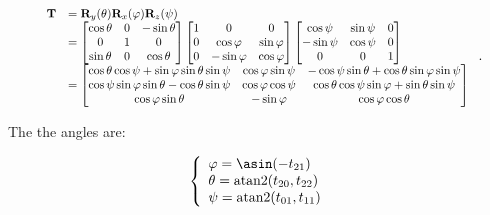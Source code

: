     \begin{equation}
        \scalebox{0.85}{
            $ \begin{array}{ll}
                \mathbf{T}
                &= \mathbf{R}_{y}(\theta)\mathbf{R}_{x}(\varphi)\mathbf{R}_{z}(\psi) \\
                &=
                \begin{bmatrix}
                    \cos \theta & 0 & -\sin \theta \\
                    0 & 1 & 0 \\
                    \sin \theta & 0 & \cos \theta
                \end{bmatrix}
                \begin{bmatrix}
                    1 & 0 & 0 \\
                    0 & \cos \varphi & \sin \varphi \\
                    0 & -\sin \varphi & \cos \varphi
                \end{bmatrix}
                \begin{bmatrix}
                    \cos \psi & \sin \psi & 0 \\
                    -\sin \psi & \cos \psi & 0 \\
                    0 & 0 & 1
                \end{bmatrix} \\
                &=
                \begin{bmatrix}
                    \cos \theta \cos \psi + \sin \varphi \sin \theta \sin \psi
                    &  \cos \varphi \sin \psi
                    & -\cos \psi \sin \theta + \cos \theta \sin \varphi \sin \psi \\
                    \cos \psi \sin \varphi \sin \theta - \cos \theta \sin \psi
                    & \cos \varphi \cos \psi
                    & \cos \theta \cos \psi \sin \varphi + \sin \theta \sin \psi \\
                    \cos \varphi \sin \theta
                    & -\sin \varphi
                    & \cos \varphi \cos \theta
                \end{bmatrix}
            \end{array} $
        }
    .\end{equation}

    The the angles are:

    \begin{equation}
        \left\{ \begin{array}{l}
            \varphi = \asin(-t_{21}) \\
            \theta = \atantwo(t_{20}, t_{22}) \\
            \psi = \atantwo(t_{01}, t_{11})
        \end{array} \right.
    \end{equation}


